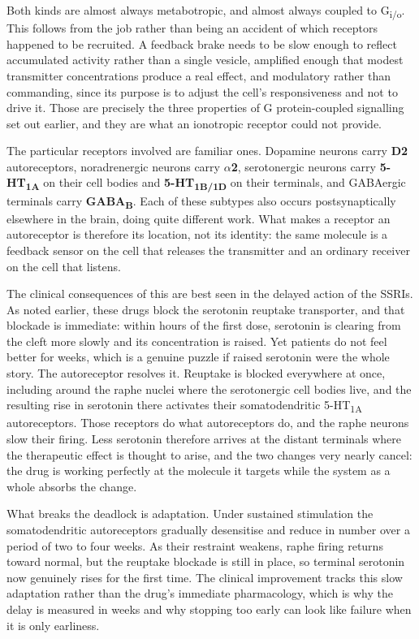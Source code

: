 \documentclass[11pt]{article}
\begin{document}
Both kinds are almost always metabotropic, and almost always coupled to G\textsubscript{i/o}. This follows from the job rather than being an accident of which receptors happened to be recruited. A feedback brake needs to be slow enough to reflect accumulated activity rather than a single vesicle, amplified enough that modest transmitter concentrations produce a real effect, and modulatory rather than commanding, since its purpose is to adjust the cell's responsiveness and not to drive it. Those are precisely the three properties of G protein-coupled signalling set out earlier, and they are what an ionotropic receptor could not provide.

The particular receptors involved are familiar ones. Dopamine neurons carry \textbf{D2} autoreceptors, noradrenergic neurons carry \textbf{$\alpha$2}, serotonergic neurons carry \textbf{5-HT\textsubscript{1A}} on their cell bodies and \textbf{5-HT\textsubscript{1B/1D}} on their terminals, and GABAergic terminals carry \textbf{GABA\textsubscript{B}}. Each of these subtypes also occurs postsynaptically elsewhere in the brain, doing quite different work. What makes a receptor an autoreceptor is therefore its location, not its identity: the same molecule is a feedback sensor on the cell that releases the transmitter and an ordinary receiver on the cell that listens.

The clinical consequences of this are best seen in the delayed action of the SSRIs. As noted earlier, these drugs block the serotonin reuptake transporter, and that blockade is immediate: within hours of the first dose, serotonin is clearing from the cleft more slowly and its concentration is raised. Yet patients do not feel better for weeks, which is a genuine puzzle if raised serotonin were the whole story. The autoreceptor resolves it. Reuptake is blocked everywhere at once, including around the raphe nuclei where the serotonergic cell bodies live, and the resulting rise in serotonin there activates their somatodendritic 5-HT\textsubscript{1A} autoreceptors. Those receptors do what autoreceptors do, and the raphe neurons slow their firing. Less serotonin therefore arrives at the distant terminals where the therapeutic effect is thought to arise, and the two changes very nearly cancel: the drug is working perfectly at the molecule it targets while the system as a whole absorbs the change.

What breaks the deadlock is adaptation. Under sustained stimulation the somatodendritic autoreceptors gradually desensitise and reduce in number over a period of two to four weeks. As their restraint weakens, raphe firing returns toward normal, but the reuptake blockade is still in place, so terminal serotonin now genuinely rises for the first time. The clinical improvement tracks this slow adaptation rather than the drug's immediate pharmacology, which is why the delay is measured in weeks and why stopping too early can look like failure when it is only earliness.
\end{document}
